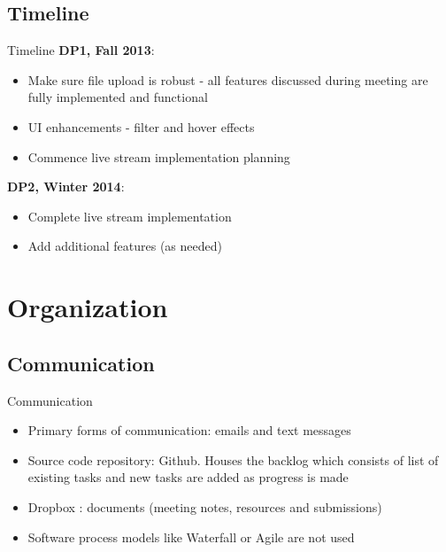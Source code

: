 \documentclass{beamer}
\begin{document}
\subsection{Timeline}
\begin{frame}{Timeline}
\textbf{DP1, Fall 2013}:
\begin{itemize}
\item Make sure file upload is robust - all features discussed during meeting are fully implemented and functional
\item UI enhancements - filter and hover effects
\item Commence live stream implementation planning
\end{itemize}
\textbf{DP2, Winter 2014}:
\begin{itemize}
\item Complete live stream implementation
\item Add additional features (as needed)
\end{itemize}
\end{frame}


\section{Organization}

\subsection{Communication}
\begin{frame}{Communication}
\begin{itemize}
\item Primary forms of communication: emails and text messages
\item Source code repository: Github. Houses the backlog which consists of list of existing tasks and new tasks are added as progress is made
\item Dropbox : documents (meeting notes, resources and submissions)
\item Software process models like Waterfall or Agile are not used
\end{itemize}
\end{frame}
\end{document}
